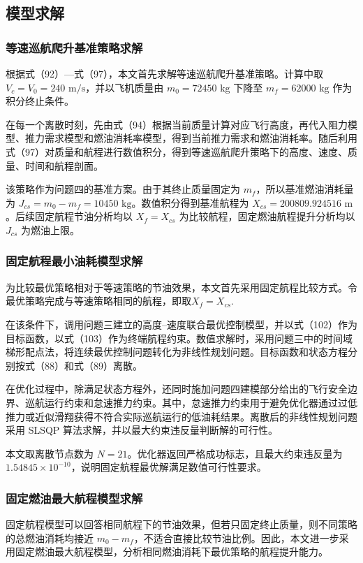\documentclass[UTF8]{ctexart}
\begin{document}
\subsection{模型求解}
\subsubsection{等速巡航爬升基准策略求解}

根据式（92）—式（97），本文首先求解等速巡航爬升基准策略。计算中取 $V_c=V_0=240\text{ m/s}$，并以飞机质量由 $m_0=72450\text{ kg}$ 下降至 $m_f=62000\text{ kg}$ 作为积分终止条件。

在每一个离散时刻，先由式（94）根据当前质量计算对应飞行高度，再代入阻力模型、推力需求模型和燃油消耗率模型，得到当前推力需求和燃油消耗率。随后利用式（97）对质量和航程进行数值积分，得到等速巡航爬升策略下的高度、速度、质量、时间和航程剖面。

该策略作为问题四的基准方案。由于其终止质量固定为 $m_f$，所以基准燃油消耗量为 $J_{cs}=m_0-m_f=10450\text{ kg}$。数值积分得到基准航程为 $X_{cs}=200809.924516\text{ m}$。后续固定航程节油分析均以 $X_f=X_{cs}$ 为比较航程，固定燃油航程提升分析均以 $J_{cs}$ 为燃油上限。

\subsubsection{固定航程最小油耗模型求解}
为比较最优策略相对于等速策略的节油效果，本文首先采用固定航程比较方式。令最优策略完成与等速策略相同的航程，即取$X_f=X_{cs}.$

在该条件下，调用问题三建立的高度–速度联合最优控制模型，并以式（102）作为目标函数，以式（103）作为终端航程约束。数值求解时，采用问题三中的时间域梯形配点法，将连续最优控制问题转化为非线性规划问题。目标函数和状态方程分别按式（88）和式（89）离散。

在优化过程中，除满足状态方程外，还同时施加问题四建模部分给出的飞行安全边界、巡航运行约束和怠速推力约束。其中，怠速推力约束用于避免优化器通过过低推力或近似滑翔获得不符合实际巡航运行的低油耗结果。离散后的非线性规划问题采用 SLSQP 算法求解，并以最大约束违反量判断解的可行性。

本文取离散节点数为 $N=21$。优化器返回严格成功标志，且最大约束违反量为 $1.54845\times10^{-10}$，说明固定航程最优解满足数值可行性要求。
\subsubsection{固定燃油最大航程模型求解}
固定航程模型可以回答相同航程下的节油效果，但若只固定终止质量，则不同策略的总燃油消耗均接近 $m_0-m_f$，不适合直接比较节油比例。因此，本文进一步采用固定燃油最大航程模型，分析相同燃油消耗下最优策略的航程提升能力。
\end{document}
